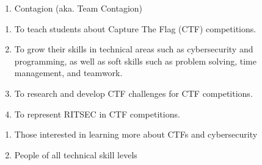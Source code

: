

\begin{enumerate}
	\item Contagion (aka. Team Contagion)
\end{enumerate}


\begin{enumerate}
	\item To teach students about Capture The Flag (CTF) competitions.
	\item To grow their skills in technical areas such as cybersecurity and programming,
	      as well as soft skills such as problem solving, time management, and teamwork.
	\item To research and develop CTF challenges for CTF competitions.
	\item To represent RITSEC in CTF competitions.
\end{enumerate}


\begin{enumerate}
	\item Those interested in learning more about CTFs and cybersecurity
	\item People of all technical skill levels
\end{enumerate}